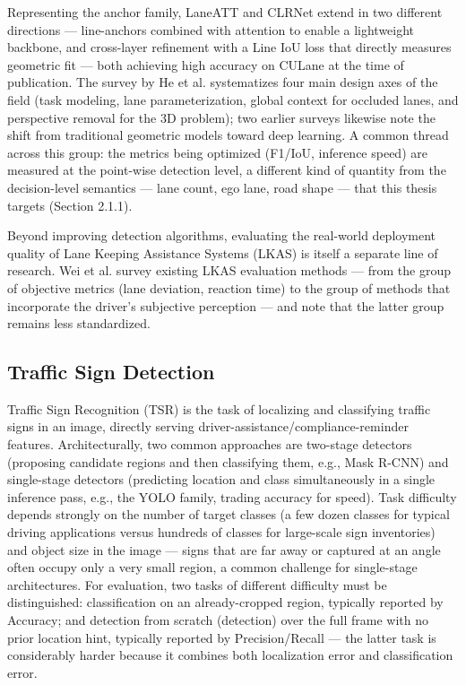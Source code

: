 \documentclass[12pt,a4paper]{report}
\begin{document}
Representing the anchor family, LaneATT \cite{tabelini2021laneatt} and CLRNet \cite{zheng2022clrnet} extend in two different directions --- line-anchors combined with attention to enable a lightweight backbone, and cross-layer refinement with a Line IoU loss that directly measures geometric fit --- both achieving high accuracy on CULane at the time of publication. The survey by He et al. \cite{he2024monocularsurvey} systematizes four main design axes of the field (task modeling, lane parameterization, global context for occluded lanes, and perspective removal for the 3D problem); two earlier surveys \cite{zhang2021survey,zakaria2023slr} likewise note the shift from traditional geometric models toward deep learning. A common thread across this group: the metrics being optimized (F1/IoU, inference speed) are measured at the point-wise detection level, a different kind of quantity from the decision-level semantics --- lane count, ego lane, road shape --- that this thesis targets (Section 2.1.1).

Beyond improving detection algorithms, evaluating the real-world deployment quality of Lane Keeping Assistance Systems (LKAS) is itself a separate line of research. Wei et al. \cite{wei2024lkas} survey existing LKAS evaluation methods --- from the group of objective metrics (lane deviation, reaction time) to the group of methods that incorporate the driver's subjective perception --- and note that the latter group remains less standardized.

\subsection{Traffic Sign Detection}

Traffic Sign Recognition (TSR) is the task of localizing and classifying traffic signs in an image, directly serving driver-assistance/compliance-reminder features. Architecturally, two common approaches are two-stage detectors (proposing candidate regions and then classifying them, e.g., Mask R-CNN) and single-stage detectors (predicting location and class simultaneously in a single inference pass, e.g., the YOLO family, trading accuracy for speed). Task difficulty depends strongly on the number of target classes (a few dozen classes for typical driving applications versus hundreds of classes for large-scale sign inventories) and object size in the image --- signs that are far away or captured at an angle often occupy only a very small region, a common challenge for single-stage architectures. For evaluation, two tasks of different difficulty must be distinguished: classification on an already-cropped region, typically reported by Accuracy; and detection from scratch (detection) over the full frame with no prior location hint, typically reported by Precision/Recall --- the latter task is considerably harder because it combines both localization error and classification error.
\end{document}
